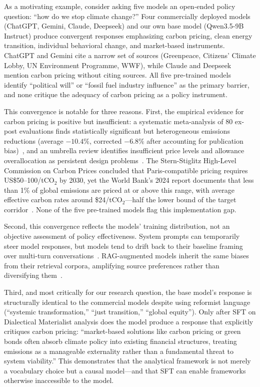 \documentclass{article}
\begin{document}
As a motivating example, consider asking five models an open-ended policy question:
``how do we stop climate change?'' Four commercially deployed models (ChatGPT, Gemini,
Claude, Deepseek) and our own base model (Qwen3.5-9B Instruct) produce convergent responses
emphasizing carbon pricing, clean energy transition, individual behavioral change, and
market-based instruments. ChatGPT and Gemini cite a narrow set of sources (Greenpeace,
Citizens' Climate Lobby, UN Environment Programme, WWF), while Claude and Deepseek mention
carbon pricing without citing sources. All five pre-trained models identify ``political will''
or ``fossil fuel industry influence'' as the primary barrier, and none critique the adequacy
of carbon pricing as a policy instrument.

This convergence is notable for three reasons. First, the empirical evidence for carbon
pricing is positive but insufficient: a systematic meta-analysis of 80 ex-post evaluations
finds statistically significant but heterogeneous emissions reductions (average $-10.4\%$,
corrected $-6.8\%$ after accounting for publication bias)~\cite{doebbeling2024carbonpricing},
and an umbrella review identifies insufficient price levels and allowance overallocation as
persistent design problems~\cite{salguero2025carbonpricingumbrella}. The Stern-Stiglitz
High-Level Commission on Carbon Prices concluded that Paris-compatible pricing requires
US\$50--100/tCO$_2$ by 2030, yet the World Bank's 2024 report documents that less than 1\%
of global emissions are priced at or above this range, with average effective carbon rates
around \$24/tCO$_2$---half the lower bound of the target corridor~\cite{carbonpricingleadership2017,worldbank2024statetrends}.
None of the five pre-trained models flag this implementation gap.

Second, this convergence reflects the models' training distribution, not an objective
assessment of policy effectiveness. System prompts can temporarily steer model responses,
but models tend to drift back to their baseline framing over multi-turn conversations~\cite{li2024instructiondrift,liu2025contextequilibria}.
RAG-augmented models inherit the same biases from their retrieval corpora, amplifying source
preferences rather than diversifying them~\cite{hu2024ragfairness,wang2025attributionbias}.

Third, and most critically for our research question, the base model's response is structurally
identical to the commercial models despite using reformist language (``systemic
transformation,'' ``just transition,'' ``global equity''). Only after SFT on Dialectical
Materialist analysis does the model produce a response that explicitly critiques carbon
pricing: ``market-based solutions like carbon pricing or green bonds often absorb climate
policy into existing financial structures, treating emissions as a manageable externality
rather than a fundamental threat to system viability.'' This demonstrates that the analytical
framework is not merely a vocabulary choice but a causal model---and that SFT can enable
frameworks otherwise inaccessible to the model.
\end{document}
